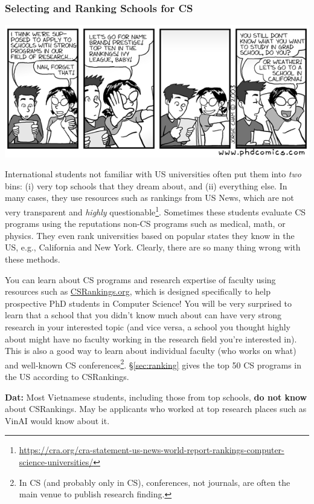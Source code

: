 \documentclass[11pt]{article}
\newenvironment{commentbox}[1][]{
\small
    \begin{mybox}
    {\small \textbf{#1}}
 }{
   \end{mybox}
}
\begin{document}
\subsubsection{Selecting and Ranking Schools for CS}
   \begin{center}
    \includegraphics[scale=0.5]{c1.png}
   \end{center}

International students not familiar with US universities often put them into \emph{two} bins:  (i) very top schools that they dream about, and (ii) everything else.  In many cases, they use resources such as rankings from US News, which are not very transparent and \emph{highly} questionable\footnote{\url{https://cra.org/cra-statement-us-news-world-report-rankings-computer-science-universities/}}.  Sometimes these students evaluate CS programs using the reputations non-CS programs such as medical, math, or physics.
They even rank universities based on popular states they know in the US, e.g., California and New York.  Clearly, there are so many thing wrong with these methods. 

You can learn about CS programs and research expertise of faculty using resources such as \href{https://csrankings.org}{CSRankings.org}, which is designed specifically to help prospective PhD students in Computer Science!  You will be very surprised to learn that a school that you didn't know much about can have very strong research in your interested topic (and vice versa, a school you thought highly about might have no faculty working in the research field you're interested in). This is also a good way to learn about individual faculty (who works on what) and well-known CS conferences\footnote{In CS (and probably only in CS), conferences, not journals, are often the main venue to publish research finding.}. \S\ref{sec:ranking} gives the top 50 CS programs in the US according to CSRankings.

\begin{commentbox}[Dat:] Most Vietnamese students, including those from top schools, \textbf{do not know} about CSRankings.  May be applicants who worked at top research places such as VinAI would know about it.
\end{commentbox}
\end{document}
